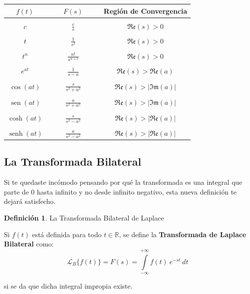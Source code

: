 \documentclass[12pt]{article}
\theoremstyle{definition}
\newtheorem{definition}{Definici\'on}[section]
\theoremstyle{theorem}
\theoremstyle{corolary}
\theoremstyle{method}
\DeclareMathOperator{\sen}{sen}
\DeclareMathOperator{\senh}{senh}
\begin{document}
{\large
\begin{center}
\begin{tabular}{c|c|c}
$f(t)$ & $\qquad F(s) \qquad$ & Regi\'on de Convergencia\\
\hline
&&\\
$c$ & $\displaystyle\frac{c}{s}$ & $\mathfrak{Re}(s)>0$\\
&&\\
$t$ & $\displaystyle\frac{1}{s^2}$ & $\mathfrak{Re}(s)>0$\\
&&\\
$t^n$ & $\displaystyle\frac{n!}{s^{n+1}}$ & $\mathfrak{Re}(s)>0$\\
&&\\
$e^{at}$ & $\displaystyle\frac{1}{s-a}$ & $\mathfrak{Re}(s)>\mathfrak{Re}(a)$\\
&&\\
$\cos(at)$ & $\displaystyle\frac{s}{s^2+a^2}$ & $\mathfrak{Re}(s)>|\mathfrak{Im}(a)|$\\
&&\\
$\sen(at)$ & $\displaystyle\frac{a}{s^2+a^2}$ & $\mathfrak{Re}(s)>|\mathfrak{Im}(a)|$\\
&&\\
$\cosh(at)$ & $\displaystyle\frac{s}{s^2-a^2}$ & $\mathfrak{Re}(s)>|\mathfrak{Re}(a)|$\\
&&\\
$\senh(at)$ & $\displaystyle\frac{a}{s^2-a^2}$ & $\mathfrak{Re}(s)>|\mathfrak{Re}(a)|$\\
\end{tabular}
\linebreak
\end{center}
}


\subsection*{La Transformada Bilateral}
Si te quedaste inc\'omodo pensando por qu\'e la transformada es una integral que parte de 0 hasta infinito y no desde infinito negativo, esta nueva definici\'on te dejar\'a satisfecho.\\

\colorbox{red!40!white!80}{\parbox{\linewidth}{
\theoremstyle{definition}
\begin{definition}{La Transformada Bilateral de Laplace}

Si $f(t)$ est\'a definida para todo $t\in \mathbb{R}$, se define la \textbf{Transformada de Laplace Bilateral} como: $$\mathscr{L}_B\{f(t)\} = F(s) = \int\limits_{-\infty}^{+\infty}f(t)\ e^{-st}\ dt $$

si se da que dicha integral impropia existe.
\end{definition}}}
\linebreak
\linebreak
\end{document}
